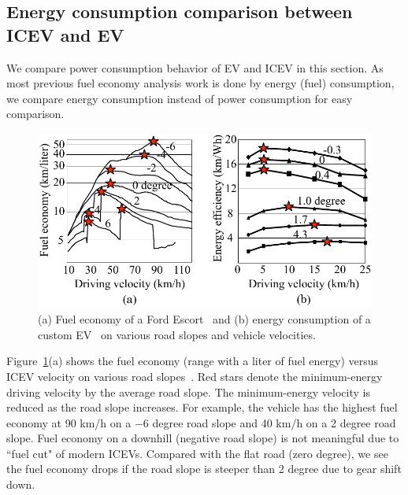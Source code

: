 \documentclass{IEEEtran}
\begin{document}
\subsection{Energy consumption comparison between ICEV and EV} \label{subsec:comparison}

We compare power consumption behavior of EV and ICEV in this section. As most previous fuel economy analysis work is done by energy (fuel) consumption, we compare energy consumption instead of power consumption for easy comparison. 

\begin{figure}	%
\includegraphics[width=1.0\hsize]{Figures/ICEV_EV_consumption.pdf}
\caption{(a) Fuel economy of a Ford Escort~\cite{Hooker:TR88} and (b) energy consumption of a custom EV~\cite{Chang:ICCAD14} on various road slopes and vehicle velocities.}
\label{fig:ICEV_EV_consumption}
\end{figure} 

Figure~\ref{fig:ICEV_EV_consumption}(a) shows the fuel economy (range with a liter of fuel energy) versus ICEV velocity on various road slopes~\cite{Hooker:TR88}. Red stars denote  the minimum-energy driving velocity by the average road slope. The minimum-energy velocity is reduced as the road slope increases. For example, the vehicle has the highest fuel economy at 90 km/h on  a $-6$ degree road slope and 40 km/h on a 2 degree road slope.  Fuel economy on a downhill (negative road slope) is not meaningful due to ``fuel cut" of modern ICEVs. Compared with the flat road (zero degree), we see the fuel economy drops if the road slope is steeper than 2 degree due to gear shift down.
\end{document}
